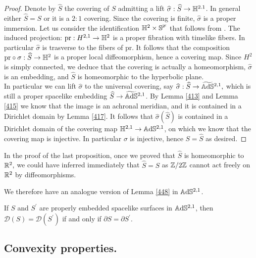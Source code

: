 \begin{proof}

    Denote by $\widehat{S}$ the covering of $S$ admitting a lift $\widehat{\sigma}:\widehat{S}\to\mathbb{H}^{2.1}$. In general either $\widehat{S}=S$ or it is a $2:1$ covering. Since the covering is finite, $\widehat{\sigma}$ is a proper immersion. Let us consider the identification $\mathbb{H}^2\times\mathbb{S^1}$ that follows from . The induced projection: $\text{pr}:H^{2,1}\to\mathbb{H}^2$ is a proper fibration with timelike fibers. In particular $\widehat{\sigma}$ is trasverse to the fibers of $\text{pr}.$ It follows that the composition $\text{pr}\circ\sigma:\widehat{S}\to\mathbb{H}^2$ is a proper local diffeomorphism, hence a covering map. Since $H^2$ is simply connected, we deduce that the covering is actually a homeomorphism, $\widehat{\sigma}$ is an embedding, and $\widehat{S}$ is homeomorphic to the hyperbolic plane. \\
    In particular we can lift $\widehat{\sigma}$ to the universal covering, say $\widehat{\sigma}:\widehat{S}\to\widetilde{\mathbb{A}\mathrm{d}\mathbb{S}}{}^{2,1},$ which is still a proper spacelike embedding $\widehat{S}\to \widetilde{\mathbb{A}\mathrm{d}\mathbb{S}}{}^{2,1}$. By Lemma \ref{413} and Lemma \ref{415} we know that the image is an achronal meridian, and it is contained in a Dirichlet domain by Lemma \ref{417}. It follows that $\widehat{\sigma}(\widehat{S})$ is contained in a Dirichlet domain of the covering map $\mathbb{H}^{2,1}\to\mathbb{A}\mathrm{d}\mathbb{S}^{2,1}$, on which we know that the covering map is injective. In particular $\sigma$ is injective, hence $S=\widehat{S}$ as desired.  
\end{proof}

\begin{observation}
    In the proof of the last proposition, once we proved that $\hat{S}$ is homeomorphic to $\mathbb{R}^2,$ we could have inferred immediately that $\hat{S}=S$ as $\mathbb{Z}/2\mathbb{Z}$ cannot act freely on $\mathbb{R}^2$ by diffeomorphisms. 
\end{observation}

We therefore have an analogue version of Lemma \ref{448} in $\mathbb{A}\mathrm{d}\mathbb{S}^{2,1}$.

\begin{corollary}
    If $S$ and $S^{\prime}$ are properly embedded spacelike surfaces in $\mathbb{A}\mathrm{d}\mathbb{S}^{2,1}$, then $\mathcal{D}(S)=\mathcal{D}(S^{\prime})$ if and only if $\partial S=\partial S^{\prime}$. 
\end{corollary}

\subsection{Convexity properties.}

